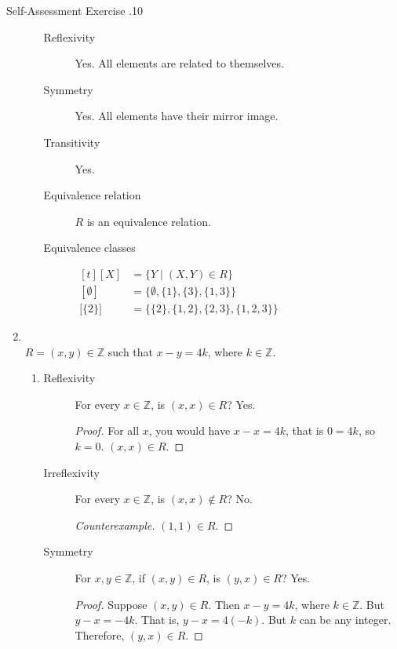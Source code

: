 \documentclass[\main/notes.tex]{subfiles}
\begin{document}
\begin{exercise}{Self-Assessment Exercise \thechapter.10}
\begin{enumerate}
\begin{enumerate}[label=(\alph*)]
\begin{description}
										\item[Reflexivity] Yes. All elements are related to themselves.
										\item[Symmetry] Yes. All elements have their mirror image.
										\item[Transitivity] Yes.
										\item[Equivalence relation] $R$ is an equivalence relation.
										\item[Equivalence classes] $
											\begin{aligned}[t]
												[X] &= \{Y \mid (X, Y) \in R\}\\
												[\emptyset] &= \bigl\{\emptyset, \{1\}, \{3\}, \{1, 3\}\bigr\}\\
												\bigl[\{2\}\bigr] &= \bigl\{\{2\}, \{1, 2\}, \{2, 3\}, \{1, 2, 3\}\bigr\}
											\end{aligned} $   
									\end{description}
							\end{enumerate}
						\item {}\\
							$R = (x, y) \in \mathbb{Z}$ such that $ x - y = 4k$, where $k \in \mathbb{Z}$.
							\begin{enumerate}[label=(\alph*)]
								\item {}
									\begin{description}
										\item[Reflexivity] For every $x \in \mathbb{Z}$, is $(x, x) \in R$? Yes.
											\begin{proof}
												For all $x$, you would have $x - x = 4k$, that is $0 = 4k$, so $k = 0$. $(x, x) \in R$.
											\end{proof}
										\item[Irreflexivity] For every $x \in \mathbb{Z}$, is $(x, x) \notin R$? No.
											\begin{proof}[Counterexample]
												$(1, 1) \in R$.
											\end{proof}
										\item[Symmetry] For $x, y \in \mathbb{Z}$, if $(x, y) \in R$, is $(y, x) \in R$? Yes.
											\begin{proof}
												Suppose $(x, y) \in R$. Then $x - y = 4k$, where $k \in \mathbb{Z}$. But $y - x = -4k$. That is, $y - x = 4(-k)$. But $k$ can be any integer. Therefore, $(y, x) \in R$.

\end{proof}
\end{description}
\end{enumerate}
\end{enumerate}
\end{exercise}
\end{document}
